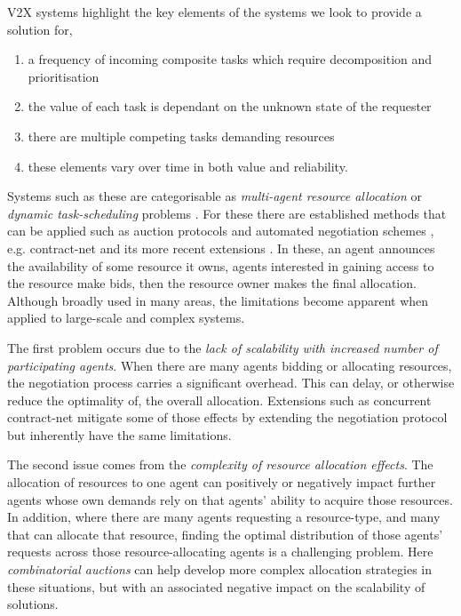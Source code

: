 V2X systems highlight the key elements of the systems we look to provide a solution for,
\begin{enumerate}
	\item {
		a frequency of incoming composite tasks which require decomposition and prioritisation}
	\item{
		the value of each task is dependant on the unknown state of the requester
		
	}
	\item {
		there are multiple competing tasks demanding resources
	}
	\item {
		these elements vary over time in both value and reliability.
	}
\end{enumerate}

Systems such as these are categorisable as \textit{multi-agent resource allocation} \cite{Briola2011} or \textit{dynamic task-scheduling} problems \cite{Shyalika2020}. For these there are established methods that can be applied such as auction protocols and automated negotiation schemes \cite{Beam1997} \cite{Fatima2001, Chevaleyre2005}, e.g. contract-net \cite{Smith1980a} and its more recent extensions \cite{Bozdag2008}. In these, an agent announces the availability of some resource it owns, agents interested in gaining access to the resource make bids, then the resource owner makes the final allocation. Although broadly used in many areas, the limitations become apparent when applied to large-scale and complex systems. 

The first problem occurs due to the \textit{lack of scalability with increased number of participating agents}. When there are many agents bidding or allocating resources, the negotiation process carries a significant overhead. This can delay, or otherwise reduce the optimality of, the overall allocation. Extensions such as concurrent contract-net \cite{Chevaleyre} mitigate some of those effects by extending the negotiation protocol but inherently have the same limitations. 

The second issue comes from the \textit{complexity of resource allocation effects}. The allocation of resources to one agent can positively or negatively impact further agents whose own demands rely on that agents' ability to acquire those resources. In addition, where there are many agents requesting a resource-type, and many that can allocate that resource, finding the optimal distribution of those agents' requests across those resource-allocating agents is a challenging problem. Here \textit{combinatorial auctions} \cite{Vriesde1998,Parkes2000} can help develop more complex allocation strategies in these situations, but with an associated negative impact on the scalability of solutions.   

